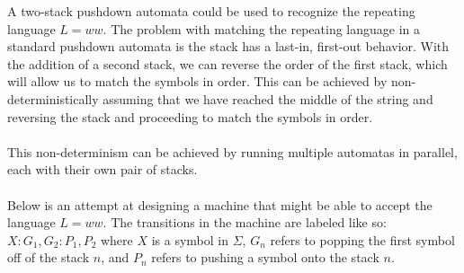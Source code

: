 \documentclass{article}%
\begin{document}
A two-stack pushdown automata could be used to recognize the repeating language $L = ww$. The problem
with matching the repeating language in a standard pushdown automata is the stack has a last-in,
first-out behavior. With the addition of a second stack, we can reverse the order of the first stack,
which will allow us to match the symbols in order. This can be achieved by non-deterministically assuming
that we have reached the middle of the string and reversing the stack and proceeding to match the symbols
in order.\\
\\
This non-determinism can be achieved by running multiple automatas in parallel, each with their own pair
of stacks.\\
\\
Below is an attempt at designing a machine that might be able to accept the language $L = ww$. The
transitions in the machine are labeled like so: $X : G_1, G_2 : P_1, P_2$ where $X$ is a symbol in $\Sigma$,
$G_n$ refers to popping the first symbol off of the stack $n$, and $P_n$ refers to pushing a symbol onto the
stack $n$.\\
\\
\end{document}
